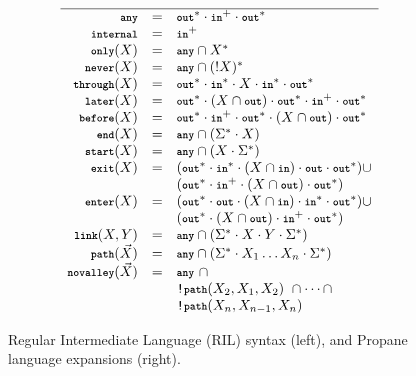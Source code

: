 \begin{figure}
\begin{minipage}[t]{.45\linewidth}
  \end{minipage}
  ~~
  \vrule
  ~~
  \begin{minipage}[t]{.5\linewidth}\small
  \vspace*{-1\baselineskip}
  \[\begin{array}{rcl}
    \hline
    \Any           & = & \Out^* \cdot \In^+ \cdot \Out^* \\
    \Internal      & = & \In^+ \\
    \Only(X)       & = & \Any \cap X^* \\
    \Never(X)      & = & \Any \cap (!X)^* \\
    \Through(X)    & = & \Out^* \cdot \In^* \cdot X \cdot \In^* \cdot \Out^* \\
    \Later(X)      & = & \Out^* \cdot (X \cap \Out) \cdot \Out^* \cdot \In^+ \cdot \Out^* \\
    \Before(X)     & = & \Out^* \cdot \In^+ \cdot \Out^* \cdot (X \cap \Out) \cdot \Out^* \\
    \End(X)        & = & \Any \cap (\Sigma^* \cdot X) \\
    \Start(X)      & = & \Any \cap (X \cdot \Sigma^*) \\
    \Exit(X)       & = & (\Out^* \cdot \In^* \cdot (X \cap \In) \cdot \Out \cdot \Out^*) \cup \\
                  &        & (\Out^* \cdot \In^+ \cdot (X \cap \Out) \cdot \Out^*) \\
    \Enter(X)      & = & (\Out^* \cdot \Out \cdot (X \cap \In) \cdot \In^* \cdot \Out^*) \cup \\
                  &        & (\Out^* \cdot (X \cap \Out) \cdot \In^+ \cdot \Out^*) \\
    \LinkKW(X,Y)     & = & \Any \cap (\Sigma^* \cdot X \cdot Y \cdot \Sigma^*) \\
    \PathKW(\vec{X}) & = & \Any \cap (\Sigma^* \cdot X_1 \dots X_n \cdot \Sigma^*) \\
    \Novalley(\vec{X}) & = & \Any ~ \cap \\
                  &   & \NOT\PathKW(X_2,X_1,X_2) ~ \cap \dots \cap \\
                  &   & \NOT\PathKW(X_n,X_{n-1},X_n) \\
  \end{array} \]

  \end{minipage}

  \hrulefill

  \caption{Regular Intermediate Language (RIL) syntax (left), and
           Propane language expansions (right).}
  \label{fig:rir-syntax}
\end{figure}


